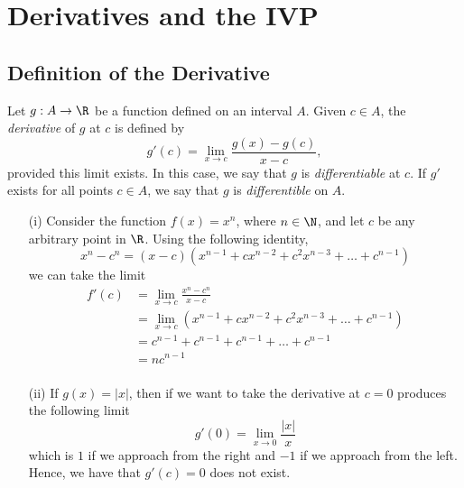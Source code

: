 \section{Derivatives and the IVP}

\subsection{Definition of the Derivative}

\begin{tcolorbox}
    \begin{defn}[Differentiability]
    Let \( g : A \to \R  \) be a function defined on an interval \( A  \). Given \( c \in A  \), the \textit{derivative} of \( g  \) at \( c  \) is defined by 
    \[ g'(c) = \lim_{ x \to c } \frac{ g(x) - g(c)  }{ x - c  }, \]
    provided this limit exists. In this case, we say that \( g  \) is \textit{differentiable} at \( c  \). If \( g'  \) exists for all points \( c \in A  \), we say that \( g  \) is \textit{differentible} on \( A  \).
    \end{defn}
\end{tcolorbox}


\begin{ex}
\begin{enumerate}
    \item[(i)] Consider the function \( f(x) = x^n  \), where \( n \in \N  \), and let \( c  \) be any arbitrary point in \( \R  \). Using the following identity, 
        \[  x^n - c^n = (x -c )(x^{n-1} + cx^{n-2} + c^2 x^{n-3} + \dots + c^{n-1}) \]
        we can take the limit 
        \begin{align*}
            f'(c) &= \lim_{ x \to c  } \frac{ x^n - c^n  }{ x - c  }  \\
                  &= \lim_{ x \to c } (x^{n-1} + cx^{n-2} + c^2 x^{n-3} + \dots + c^{n-1}) \\
                  &= c^{n-1} + c^{n-1} + c^{n-1} + \dots + c^{n-1} \\
                  &= nc^{n-1}\\
        \end{align*}
    \item[(ii)] If \( g(x) = | x  |  \), then if we want to take the derivative at \( c =0  \) produces the following limit
        \[  g'(0) = \lim_{ x \to 0 } \frac{ | x |  }{ x }  \]
        which is \( 1 \) if we approach from the right and \( -1 \) if we approach from the left. Hence, we have that \(g'(c) =  0  \) does not exist.
\end{enumerate}
\end{ex}


